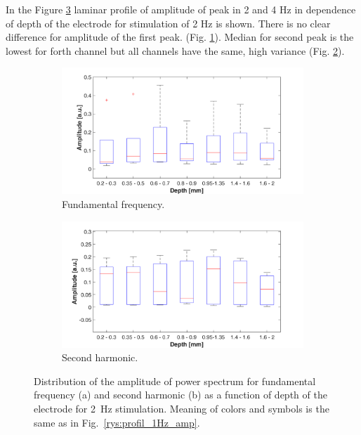 \documentclass{pracalicmgr}
\begin{document}
 In the Figure \ref{rys:profil_2Hz_wid} laminar profile of amplitude of peak in 2 and 4 Hz in dependence of depth of the electrode for stimulation of 2 Hz is shown. There is no clear difference for amplitude of the first peak. (Fig. \ref{rys:profil_2Hz_wid1}). Median for second peak is the lowest for forth channel but all channels have the same, high variance (Fig. \ref{rys:profil_2Hz_wid2}).
 
   	\begin{figure}[H]
  	\begin{subfigure}{.5\textwidth}
  		\centering
  		\includegraphics[width=1.\linewidth]{profile_2Hz_wid.png}
  		\caption{Fundamental frequency.}
  		\label{rys:profil_2Hz_wid1}
  	\end{subfigure}%
  	\begin{subfigure}{.5\textwidth}
  		\centering
  		\includegraphics[width=1.\linewidth]{profile_2Hz_wid2.png}
  		\caption{Second harmonic.}
  		\label{rys:profil_2Hz_wid2}
  	\end{subfigure}
  	
  	\caption{Distribution of the amplitude of power spectrum for fundamental frequency (a) and second harmonic (b) as a function of depth of the electrode for 2~Hz stimulation. Meaning of colors and symbols is the same as in Fig.~\ref{rys:profil_1Hz_amp}.}
  	\label{rys:profil_2Hz_wid}
  \end{figure}
\end{document}
